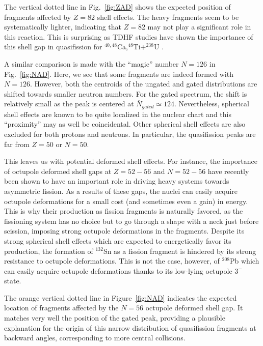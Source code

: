 \documentclass[reprint,aps,prc,twocolumn,floatfix,10pt]{revtex4-2}
\begin{document}
The vertical dotted line in Fig.~\ref{fig:ZAD} shows the expected position of fragments affected by $Z=82$ shell effects.
The heavy fragments seem to be systematically lighter, indicating that $Z=82$ may not play a significant role in this reaction.
This is surprising as TDHF studies have shown the importance of this shell gap in quasifission for $^{40,48}$Ca,$^{48}$Ti+$^{238}$U \cite{wakhle2014,oberacker2014,morjean2017}.

A similar comparison is made with the ``magic'' number $N=126$ in Fig.~\ref{fig:NAD}.
Here, we see that some fragments are indeed formed with $N=126$.
However, both the centroids of the ungated and gated distributions are shifted towards smaller neutron numbers.
For the gated spectrum, the shift is relatively small as the peak is centered at $\overline{N}_{gated}\simeq124$. Nevertheless, spherical shell effects are known to be quite localized in the nuclear chart and this ``proximity'' may as well be coincidental.
Other spherical shell effects are also excluded for both protons and neutrons.
In particular, the quasifission peaks are far from $Z=50$ or $N=50$.

This leaves us with potential deformed shell effects.
For instance, the importance of octupole deformed shell gaps at $Z=52-56$ \cite{scamps2018} and $N=52-56$ \cite{scamps2019} have recently been shown to have an important role in driving heavy systems towards asymmetric fission.
As a results of these gaps, the nuclei can easily acquire octupole deformations for a small cost (and sometimes even a gain) in energy.
This is why their production as fission fragments is naturally favored, as the fissioning system has no choice but to go through a shape with a neck just before scission, imposing strong octupole deformations in the fragments.
Despite its strong spherical shell effects which are expected to energetically favor its production, the formation of $^{132}$Sn as a fission fragment is hindered by its strong resistance to octupole deformations.
This is not the case, however, of $^{208}$Pb which can easily acquire octupole deformations thanks to its low-lying octupole $3^-$ state.

The orange vertical dotted line in Figure~\ref{fig:NAD} indicates the expected location of fragments affected by the $N=56$ octupole deformed shell gap.
It matches very well the position of the gated peak, providing a plausible explanation for the origin of this narrow distribution of quasifission fragments at backward angles, corresponding to more central collisions.
\end{document}
